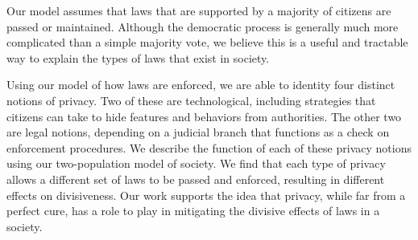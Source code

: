 Our model assumes that laws that are supported by a majority of citizens are passed or maintained.  Although the democratic process is generally much more complicated than a simple majority vote, we believe this is a useful and tractable way to explain the types of laws that exist in society.

Using our model of how laws are enforced, we are able to identity four distinct notions of privacy.  Two of these are technological, including strategies that citizens can take to hide features and behaviors from authorities.  The other two are legal notions, depending on a judicial branch that functions as a check on enforcement procedures. %
We describe the function of each of these privacy notions using our two-population model of society.  We find that each type of privacy allows a different set of laws to be passed and enforced, resulting in different effects on divisiveness.  Our work supports the idea that privacy, while far from a perfect cure, has a role to play in mitigating the divisive effects of laws in a society.



